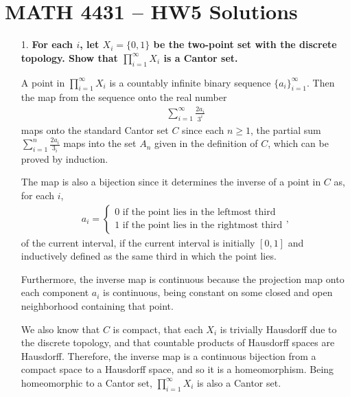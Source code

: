 \documentclass[a4paper,12pt]{article}
\begin{document}
\section*{MATH 4431 -- HW5 Solutions}
\begin{enumerate}
    \item[1.]
        \boldmath\textbf{For each $i$, let $X_i = \{0, 1\}$ be the two-point set with the discrete topology. Show that $\prod_{i = 1}^\infty X_i$ is a Cantor set.
        }\unboldmath \par
        A point in $\prod_{i = 1}^\infty X_i$ is a countably infinite binary sequence $\{ a_i \}_{i = 1}^\infty$. Then the map from the sequence onto the real number
        \begin{align*}
            \sum_{i = 1}^\infty \frac{2a_i}{3^i}
        \end{align*}
        maps onto the standard Cantor set $C$ since each $n \geq 1$, the partial sum $\sum_{i = 1}^n \frac{2a_i}{3_i}$ maps into the set $A_n$ given in the definition of $C$, which can be proved by induction. \par
        The map is also a bijection since it determines the inverse of a point in $C$ as, for each $i$,
        \begin{align*}
            a_i = \begin{cases}
                0 \text{ if the point lies in the leftmost third} \\
                1 \text{ if the point lies in the rightmost third}
            \end{cases},
        \end{align*}
        of the current interval, if the current interval is initially $[0, 1]$ and inductively defined as the same third in which the point lies. \par
        Furthermore, the inverse map is continuous because the projection map onto each component $a_i$ is continuous, being constant on some closed and open neighborhood containing that point. \par
        We also know that $C$ is compact, that each $X_i$ is trivially Hausdorff due to the discrete topology, and that countable products of Hausdorff spaces are Hausdorff. Therefore, the inverse map is a continuous bijection from a compact space to a Hausdorff space, and so it is a homeomorphism. Being homeomorphic to a Cantor set, $\prod_{i = 1}^\infty X_i$ is also a Cantor set.


\end{enumerate}
\end{document}
